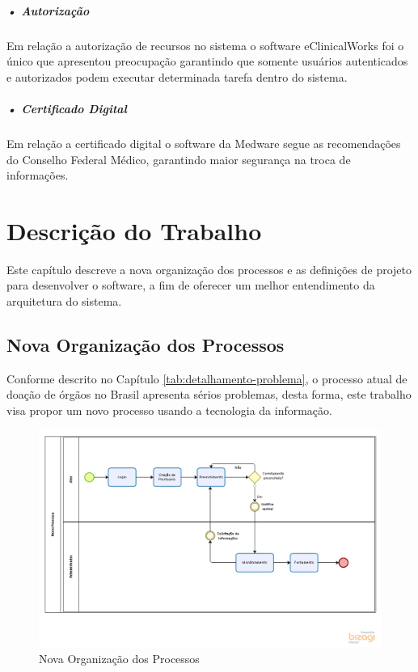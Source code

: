 \documentclass[portuguese,oneside]{tcc}
\begin{document}
\paragraph*{• Autorização}
Em relação a autorização de recursos no sistema o software eClinicalWorks foi o único que apresentou preocupação garantindo que somente usuários autenticados e autorizados podem executar determinada tarefa dentro do sistema.

\paragraph*{• Certificado Digital}
Em relação a certificado digital o software da Medware segue as recomendações do Conselho Federal Médico, garantindo maior segurança na troca de informações.

\chapter{Descrição do Trabalho} \label{tab:descricao-trabalho}
Este capítulo descreve a nova organização dos processos e as definições de projeto para desenvolver o software, a fim de oferecer um melhor entendimento da arquitetura do sistema.


\section{Nova Organização dos Processos}
Conforme descrito no Capítulo \ref{tab:detalhamento-problema}, o processo atual de doação de órgãos no Brasil apresenta sérios problemas, desta forma, este trabalho visa propor um novo processo usando a tecnologia da informação.


\begin{figure}[htp]
\centering
\caption{Nova Organização dos Processos}
\includegraphics[width=16cm]{modelagem-novo-processo}

\label{fig:novo-processo}
\end{figure}
\end{document}
